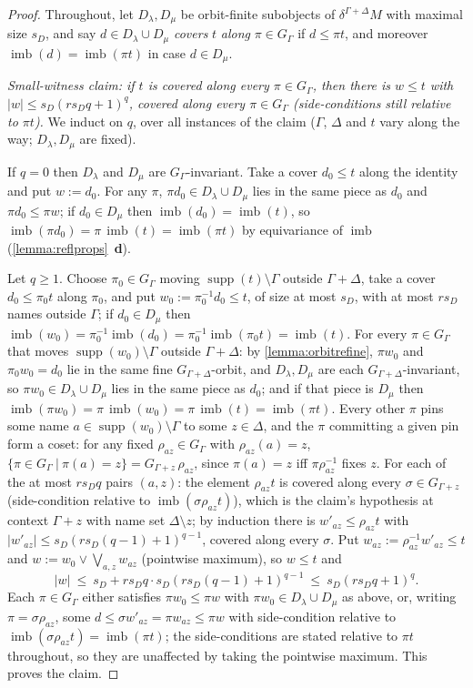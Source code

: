 \documentclass{article}
\theoremstyle{definition}
\newcommand{\supp}{\operatorname{supp}}
\newcommand{\imb}{\operatorname{imb}}
\begin{document}
\begin{proof}
    Throughout, let $D_\lambda,D_\mu$ be orbit-finite subobjects of $\delta^{\Gamma+\Delta}M$ with maximal size $s_D$, and say $d\in D_\lambda\cup D_\mu$ {\em covers} $t$ {\em along} $\pi\in G_\Gamma$ if $d\leq\pi t$, and moreover $\imb(d)=\imb(\pi t)$ in case $d\in D_\mu$.

    {\it Small-witness claim: if $t$ is covered along every $\pi\in G_\Gamma$, then there is $w\leq t$ with $|w|\leq s_D(rs_Dq+1)^q$, covered along every $\pi\in G_\Gamma$ (side-conditions still relative to $\pi t$).} We induct on $q$, over all instances of the claim ($\Gamma$, $\Delta$ and $t$ vary along the way; $D_\lambda,D_\mu$ are fixed).

    If $q=0$ then $D_\lambda$ and $D_\mu$ are $G_\Gamma$-invariant. Take a cover $d_0\leq t$ along the identity and put $w:=d_0$. For any $\pi$, $\pi d_0\in D_\lambda\cup D_\mu$ lies in the same piece as $d_0$ and $\pi d_0\leq\pi w$; if $d_0\in D_\mu$ then $\imb(d_0)=\imb(t)$, so $\imb(\pi d_0)=\pi\,\imb(t)=\imb(\pi t)$ by equivariance of $\imb$ (\cref{lemma:reflprops}~{\bf d}).

    Let $q\geq1$. Choose $\pi_0\in G_\Gamma$ moving $\supp(t)\setminus\Gamma$ outside $\Gamma+\Delta$, take a cover $d_0\leq\pi_0t$ along $\pi_0$, and put $w_0:=\pi_0^{-1}d_0\leq t$, of size at most $s_D$, with at most $rs_D$ names outside $\Gamma$; if $d_0\in D_\mu$ then $\imb(w_0)=\pi_0^{-1}\imb(d_0)=\pi_0^{-1}\imb(\pi_0t)=\imb(t)$. For every $\pi\in G_\Gamma$ that moves $\supp(w_0)\setminus\Gamma$ outside $\Gamma+\Delta$: by \cref{lemma:orbitrefine}, $\pi w_0$ and $\pi_0w_0=d_0$ lie in the same fine $G_{\Gamma+\Delta}$-orbit, and $D_\lambda,D_\mu$ are each $G_{\Gamma+\Delta}$-invariant, so $\pi w_0\in D_\lambda\cup D_\mu$ lies in the same piece as $d_0$; and if that piece is $D_\mu$ then $\imb(\pi w_0)=\pi\,\imb(w_0)=\pi\,\imb(t)=\imb(\pi t)$. Every other $\pi$ pins some name $a\in\supp(w_0)\setminus\Gamma$ to some $z\in\Delta$, and the $\pi$ committing a given pin form a coset: for any fixed $\rho_{az}\in G_\Gamma$ with $\rho_{az}(a)=z$, $\{\pi\in G_\Gamma\ |\ \pi(a)=z\}=G_{\Gamma+z}\,\rho_{az}$, since $\pi(a)=z$ iff $\pi\rho_{az}^{-1}$ fixes $z$. For each of the at most $rs_Dq$ pairs $(a,z)$: the element $\rho_{az}t$ is covered along every $\sigma\in G_{\Gamma+z}$ (side-condition relative to $\imb(\sigma\rho_{az}t)$), which is the claim's hypothesis at context $\Gamma+z$ with name set $\Delta\setminus z$; by induction there is $w'_{az}\leq\rho_{az}t$ with $|w'_{az}|\leq s_D(rs_D(q{-}1)+1)^{q-1}$, covered along every $\sigma$. Put $w_{az}:=\rho_{az}^{-1}w'_{az}\leq t$ and $w:=w_0\vee\bigvee_{a,z}w_{az}$ (pointwise maximum), so $w\leq t$ and
    $$|w|\ \leq\ s_D+rs_Dq\cdot s_D(rs_D(q{-}1)+1)^{q-1}\ \leq\ s_D(rs_Dq+1)^{q}.$$
    Each $\pi\in G_\Gamma$ either satisfies $\pi w_0\leq\pi w$ with $\pi w_0\in D_\lambda\cup D_\mu$ as above, or, writing $\pi=\sigma\rho_{az}$, some $d\leq\sigma w'_{az}=\pi w_{az}\leq\pi w$ with side-condition relative to $\imb(\sigma\rho_{az}t)=\imb(\pi t)$; the side-conditions are stated relative to $\pi t$ throughout, so they are unaffected by taking the pointwise maximum. This proves the claim.


\end{proof}
\end{document}
